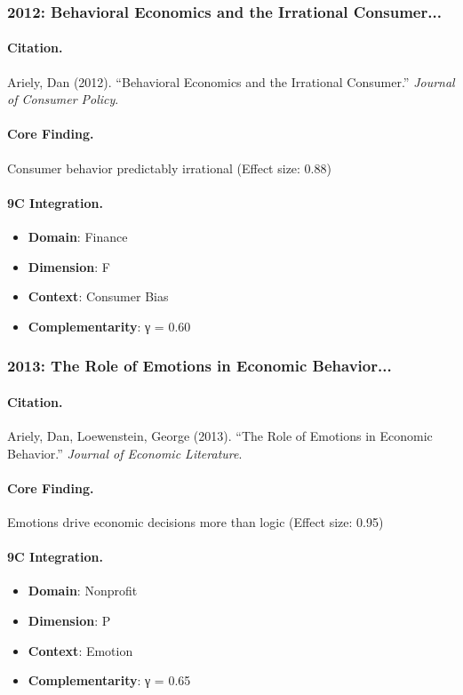 \subsubsection{2012: Behavioral Economics and the Irrational Consumer...}

\paragraph{Citation.}
Ariely, Dan (2012). ``Behavioral Economics and the Irrational Consumer.''
\textit{Journal of Consumer Policy}.

\paragraph{Core Finding.}
Consumer behavior predictably irrational (Effect size: 0.88)

\paragraph{9C Integration.}
\begin{itemize}[nosep]
  \item \textbf{Domain}: Finance
  \item \textbf{Dimension}: F
  \item \textbf{Context}: Consumer Bias
  \item \textbf{Complementarity}: γ = 0.60
\end{itemize}

\subsubsection{2013: The Role of Emotions in Economic Behavior...}

\paragraph{Citation.}
Ariely, Dan, Loewenstein, George (2013). ``The Role of Emotions in Economic Behavior.''
\textit{Journal of Economic Literature}.

\paragraph{Core Finding.}
Emotions drive economic decisions more than logic (Effect size: 0.95)

\paragraph{9C Integration.}
\begin{itemize}[nosep]
  \item \textbf{Domain}: Nonprofit
  \item \textbf{Dimension}: P
  \item \textbf{Context}: Emotion
  \item \textbf{Complementarity}: γ = 0.65
\end{itemize}

